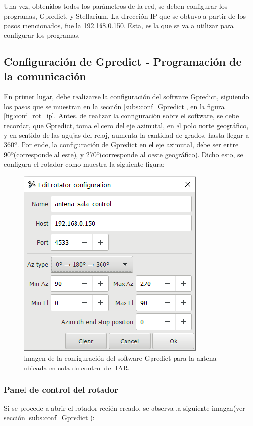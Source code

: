 Una vez, obtenidos todos los parámetros de la red, se deben configurar los programas, Gpredict, y Stellarium. La dirección IP que se obtuvo a partir de los pasos mencionados, fue la 192.168.0.150. Esta, es la que se va a utilizar para configurar los programas. 

\subsection{Configuración de Gpredict - Programación de la comunicación} 

En primer lugar, debe realizarse la configuración del software Gpredict, siguiendo los pasos que se muestran en la sección \ref{subs:conf_Gpredict}, en la figura \ref{fig:conf_rot_ip}. Antes. de realizar la configuración sobre el software, se debe recordar, que Gpredict, toma el cero del eje azimutal, en el polo norte geográfico, y en sentido de las agujas del reloj, aumenta la cantidad de grados, hasta llegar a 360º. Por ende, la configuración de Gpredict en el eje azimutal, debe ser entre 90º(corresponde al este), y 270º(corresponde al
oeste geográfico). Dicho esto, se configura el rotador como muestra la siguiente figura: 
 
\begin{figure}[ht]
	\centering 
	\includegraphics{conf_rotador_gpr}
	\caption{Imagen de la configuración del software Gpredict para la antena ubicada en sala de control del IAR. }
	\label{fig:conf_rot_sala_control}
\end{figure}
%
\subsubsection{Panel de control del rotador}
Si se procede a abrir el rotador recién creado, se observa la siguiente imagen(ver sección \ref{subs:conf_Gpredict}): 

